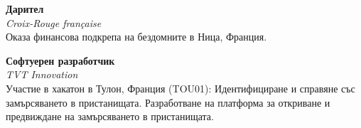 \textbf{Дарител}  \\
\textit{Croix-Rouge française} \\
\small
Оказа финансова подкрепа на бездомните в Ница, Франция.
\vspace{1ex}

\textbf{Софтуерен разработчик}  \\
\textit{TVT Innovation} \\
\small
Участие в хакатон в Тулон, Франция (TOU01): Идентифициране и справяне със замърсяването в пристанищата. Разработване на платформа за откриване и предвиждане на замърсяването в пристанищата.
